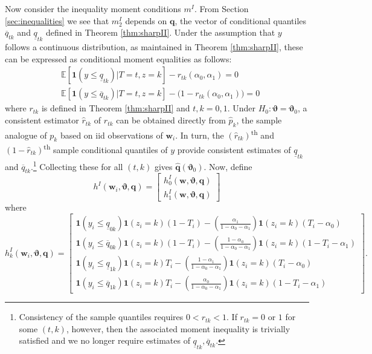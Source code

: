 Now consider the inequality moment conditions $m^I$. 
From Section \ref{sec:inequalities} we see that $m_2^I$ depends on $\mathbf{q}$,
the vector of conditional quantiles $\overline{q}_{tk}$ and $\underline{q}_{tk}$ defined in Theorem \ref{thm:sharpII}.
Under the assumption that $y$ follows a continuous distribution, as maintained in Theorem \ref{thm:sharpII}, these can be expressed as conditional moment equalities as follows:
\begin{align}
  &\mathbb{E}\left[ \mathbf{1}(y \leq \underline{q}_{tk}) |T=t,z=k \right] - r_{tk}(\alpha_0, \alpha_1) = 0 \label{eq:qunder}\\
  &\mathbb{E}\left[ \mathbf{1}(y \leq \overline{q}_{tk}) |T=t,z=k \right] - \big(1 - r_{tk}(\alpha_0, \alpha_1)\big) = 0 \label{eq:qover}
\end{align}
where $r_{tk}$ is defined in Theorem \ref{thm:sharpII} and $t,k = 0,1$.
Under $H_0\colon \boldsymbol{\vartheta} = \boldsymbol{\vartheta}_0$, a consistent estimator $\widehat{r}_{tk}$ of $r_{tk}$ can be obtained directly from $\widehat{p}_k$, the sample analogue of $p_k$ based on iid observations of $\mathbf{w}_i$.
In turn, the $(\widehat{r}_{tk})$\textsuperscript{th} and $(1 - \widehat{r}_{tk})$\textsuperscript{th} sample conditional quantiles of $y$ provide consistent estimates of $\underline{q}_{tk}$ and $\overline{q}_{tk}$.\footnote{Consistency of the sample quantiles requires $0 < r_{tk} < 1$. If $r_{tk} = 0$ or $1$ for some $(t,k)$, however, then the associated moment inequality is trivially satisfied and we no longer require estimates of $\underline{q}_{tk}, \overline{q}_{tk}$.\label{foot:quantile}}
Collecting these for all $(t,k)$ gives $\widehat{\mathbf{q}}(\boldsymbol{\vartheta}_0)$.
Now, define
\begin{equation}
h^I(\mathbf{w}_i,\boldsymbol{\vartheta}, \mathbf{q}) = 
  \left[
  \begin{array}{c}
    h^I_{0}(\mathbf{w}, \boldsymbol{\vartheta}, \mathbf{q})\\
    h^I_{1}(\mathbf{w}, \boldsymbol{\vartheta}, \mathbf{q})
  \end{array}
\right] 
\end{equation}
where
\begin{equation}
  h_k^I(\mathbf{w}_i,\boldsymbol{\vartheta},\mathbf{q}) = \left[
  \begin{array}{l}
    \mathbf{1}(y_i \leq \underline{q}_{0k}) \mathbf{1}(z_i=k)(1 - T_i) 
    - \left( \frac{\alpha_1}{1 - \alpha_0 - \alpha_1} \right) \mathbf{1}(z_i=k)(T_i-\alpha_0)\\ 
    \mathbf{1}(y_i \leq \overline{q}_{0k}) \mathbf{1}(z_i=k)(1 - T_i)
    - \left( \frac{1 - \alpha_0}{1 - \alpha_0 - \alpha_1} \right) \mathbf{1}(z_i=k)(1 - T_i-\alpha_1)\\
    \mathbf{1}(y_i \leq \underline{q}_{1k}) \mathbf{1}(z_i=k)T_i
    - \left( \frac{1 - \alpha_1}{1 - \alpha_0 - \alpha_1} \right) \mathbf{1}(z_i=k)(T_i-\alpha_0)\\ 
    \mathbf{1}(y_i \leq \overline{q}_{1k}) \mathbf{1}(z_i=k)T_i 
    - \left( \frac{\alpha_0}{1 - \alpha_0 - \alpha_1} \right) \mathbf{1}(z_i=k)(1 - T_i-\alpha_1)
  \end{array}
  \label{eq:hkI}
\right].
\end{equation}
